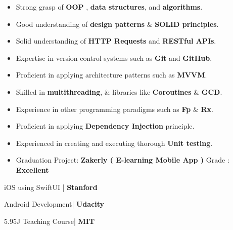 \documentclass[10pt,a4paper,ragged2e,withhyper]{altacv}
\begin{document}
\begin{paracol}{2}
        {\large\begin{itemize}
                   \item Strong grasp of \textbf{OOP} , \textbf{data structures}, and \textbf{algorithms}.
                   \item Good understanding of \textbf{design patterns} \& \textbf{SOLID principles}.
                   \item Solid understanding of \textbf{HTTP Requests} and \textbf{RESTful APIs}.
                   \item Expertise in version control systems such as \textbf{Git} and \textbf{GitHub}.
                   \item Proficient in applying architecture patterns such as \textbf{MVVM}.
                   \item Skilled in \textbf{multithreading}, \& libraries like \textbf{Coroutines} \& \textbf{GCD}.
                   \item Experience in other programming paradigms such as \textbf{Fp} \& \textbf{Rx}.
                   \item Proficient in applying \textbf{Dependency Injection} principle.
                   \item Experienced in creating and executing thorough \textbf{Unit testing}.
        \end{itemize}}

        \begin{itemize}
            \item Graduation Project: \textbf{Zakerly ( E-learning Mobile App )} Grade : \textbf{Excellent}
        \end{itemize}




        \begin{multicols}{2}
            \cvevent
            {\color{SwiftOrangeColor}\faSwift  iOS using SwiftUI} {| \textbf{Stanford}}{}{}
            \divider


            \cvevent
            {\color{AndroidGreenColor}\faAndroid Android Development}{| \textbf{Udacity}}{}{}
            \divider

            \cvevent
            {\faEdit 5.95J Teaching Course}{| \textbf{MIT}}{}{}


            \columnbreak

        \end{multicols}

    \end{paracol}
\end{document}
